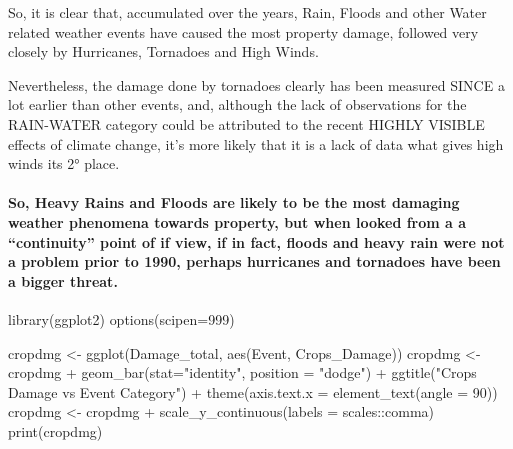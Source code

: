 \documentclass[
]{article}
\newenvironment{Shaded}{\begin{snugshade}}{\end{snugshade}}
\newcommand{\AttributeTok}[1]{\textcolor[rgb]{0.77,0.63,0.00}{#1}}
\newcommand{\DecValTok}[1]{\textcolor[rgb]{0.00,0.00,0.81}{#1}}
\newcommand{\FunctionTok}[1]{\textcolor[rgb]{0.00,0.00,0.00}{#1}}
\newcommand{\NormalTok}[1]{#1}
\newcommand{\OtherTok}[1]{\textcolor[rgb]{0.56,0.35,0.01}{#1}}
\newcommand{\SpecialCharTok}[1]{\textcolor[rgb]{0.00,0.00,0.00}{#1}}
\newcommand{\StringTok}[1]{\textcolor[rgb]{0.31,0.60,0.02}{#1}}
\begin{document}
So, it is clear that, accumulated over the years, Rain, Floods and other
Water related weather events have caused the most property damage,
followed very closely by Hurricanes, Tornadoes and High Winds.

Nevertheless, the damage done by tornadoes clearly has been measured
SINCE a lot earlier than other events, and, although the lack of
observations for the RAIN-WATER category could be attributed to the
recent HIGHLY VISIBLE effects of climate change, it's more likely that
it is a lack of data what gives high winds its 2° place.

\hypertarget{so-heavy-rains-and-floods-are-likely-to-be-the-most-damaging-weather-phenomena-towards-property-but-when-looked-from-a-a-continuity-point-of-if-view-if-in-fact-floods-and-heavy-rain-were-not-a-problem-prior-to-1990-perhaps-hurricanes-and-tornadoes-have-been-a-bigger-threat.}{%
\paragraph{So, Heavy Rains and Floods are likely to be the most damaging
weather phenomena towards property, but when looked from a a
``continuity'' point of if view, if in fact, floods and heavy rain were
not a problem prior to 1990, perhaps hurricanes and tornadoes have been
a bigger
threat.}\label{so-heavy-rains-and-floods-are-likely-to-be-the-most-damaging-weather-phenomena-towards-property-but-when-looked-from-a-a-continuity-point-of-if-view-if-in-fact-floods-and-heavy-rain-were-not-a-problem-prior-to-1990-perhaps-hurricanes-and-tornadoes-have-been-a-bigger-threat.}}

\begin{Shaded}
\begin{Highlighting}[]
\FunctionTok{library}\NormalTok{(ggplot2)}
\FunctionTok{options}\NormalTok{(}\AttributeTok{scipen=}\DecValTok{999}\NormalTok{)}

\NormalTok{cropdmg }\OtherTok{\textless{}{-}} \FunctionTok{ggplot}\NormalTok{(Damage\_total, }\FunctionTok{aes}\NormalTok{(Event, Crops\_Damage))}
\NormalTok{cropdmg }\OtherTok{\textless{}{-}}\NormalTok{ cropdmg }\SpecialCharTok{+} \FunctionTok{geom\_bar}\NormalTok{(}\AttributeTok{stat=}\StringTok{"identity"}\NormalTok{, }\AttributeTok{position =} \StringTok{"dodge"}\NormalTok{) }\SpecialCharTok{+} \FunctionTok{ggtitle}\NormalTok{(}\StringTok{"Crops Damage vs Event Category"}\NormalTok{) }\SpecialCharTok{+} \FunctionTok{theme}\NormalTok{(}\AttributeTok{axis.text.x =} \FunctionTok{element\_text}\NormalTok{(}\AttributeTok{angle =} \DecValTok{90}\NormalTok{))}
\NormalTok{cropdmg }\OtherTok{\textless{}{-}}\NormalTok{ cropdmg }\SpecialCharTok{+} \FunctionTok{scale\_y\_continuous}\NormalTok{(}\AttributeTok{labels =}\NormalTok{ scales}\SpecialCharTok{::}\NormalTok{comma)}
\FunctionTok{print}\NormalTok{(cropdmg)}
\end{Highlighting}
\end{Shaded}
\end{document}
